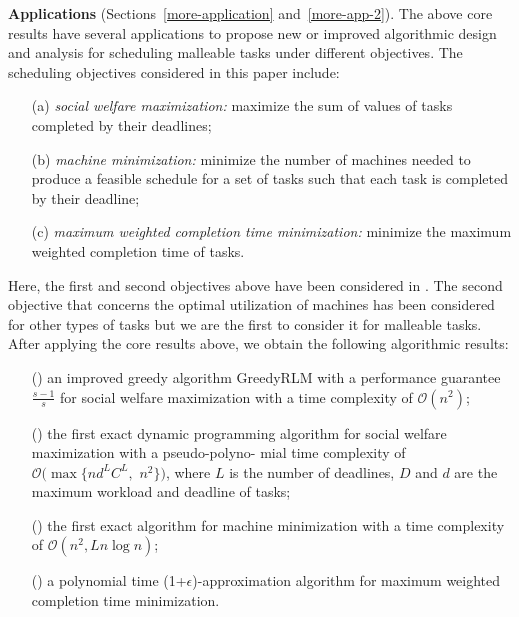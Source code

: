 \documentclass[10pt,journal,compsoc]{IEEEtran}
\newcommand{\rmnum}[1]{\romannumeral #1}
\begin{document}
\vspace{0.22em}\noindent\textbf{Applications} (Sections~\ref{more-application} and~\ref{more-app-2}). The above core results have several applications to propose new or improved algorithmic design and analysis for scheduling malleable tasks under different objectives. The scheduling objectives considered in this paper include:
\begin{enumerate}
\item [(a)] \textit{social welfare maximization:} maximize the sum of values of tasks completed by their deadlines;

\item [(b)] \textit{machine minimization:} minimize the number of machines needed to produce a feasible schedule for a set of tasks such that each task is completed by their deadline;

\item [(c)] \textit{maximum weighted completion time minimization:} minimize the maximum weighted completion time of tasks.
\end{enumerate}
Here, the first and second objectives above have been considered in \cite{Jain11a,Jain,Nagarajan}. The second objective that concerns the optimal utilization of machines has been considered for other types of tasks \cite{Chuzhoy04a} but we are the first to consider it for malleable tasks. After applying the core results above, we obtain the following algorithmic results:
\begin{itemize}
\item [(\rmnum{1})] an improved greedy algorithm GreedyRLM with a performance guarantee $\frac{s-1}{s}$ for social welfare maximization with a time complexity of $\mathcal{O}(n^{2})$;
\item [(\rmnum{2})] the first exact dynamic programming algorithm for social welfare maximization with a pseudo-polyno- mial time complexity of $\mathcal{O}(\max\{nd^{L}C^{L},$ $n^{2}\})$, where $L$ is the number of deadlines, $D$ and $d$ are the maximum workload and deadline of tasks;
\item [(\rmnum{3})] the first exact algorithm for machine minimization with a time complexity of $\mathcal{O}(n^{2}, L n \log{n})$;
\item [(\rmnum{4})] a polynomial time (1+$\epsilon$)-approximation algorithm for maximum weighted completion time minimization.
\end{itemize}
\end{document}
